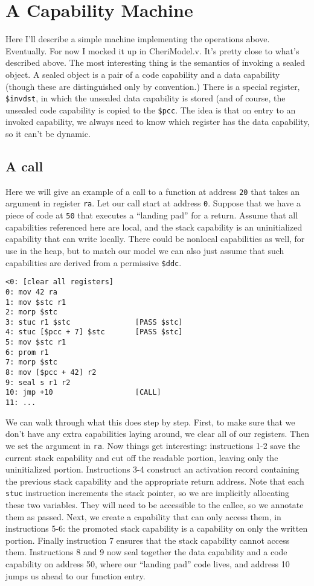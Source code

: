 \documentclass{article}
\begin{document}
\section{A Capability Machine}

Here I'll describe a simple machine implementing the operations above. Eventually. For now
I mocked it up in CheriModel.v. It's pretty close to what's described above. The most interesting
thing is the semantics of invoking a sealed object. A sealed object is a pair of a code capability
and a data capability (though these are distinguished only by convention.) There is a special register,
{\tt \$invdst}, in which the unsealed data capability is stored (and of course, the unsealed code capability
is copied to the {\tt \$pcc}. The idea is that on entry to an invoked capability, we always need to know
which register has the data capability, so it can't be dynamic.

\subsection{A call}

Here we will give an example of a call to a function at address {\tt 20} that takes an
argument in register {\tt ra}. Let our call start at address {\tt 0}. Suppose that we have a piece
of code at {\tt 50} that executes a ``landing pad'' for a return. Assume that all capabilities referenced
here are local, and the stack capability is an uninitialized capability that can write locally. There
could be nonlocal capabilities as well, for use in the heap, but to match our model we can also just assume
that such capabilities are derived from a permissive {\tt \$ddc}.

\begin{verbatim}
<0: [clear all registers]
0: mov 42 ra
1: mov $stc r1
2: morp $stc
3: stuc r1 $stc               [PASS $stc]
4: stuc [$pcc + 7] $stc       [PASS $stc]
5: mov $stc r1
6: prom r1
7: morp $stc
8: mov [$pcc + 42] r2
9: seal s r1 r2
10: jmp +10                   [CALL]
11: ...
\end{verbatim}

We can walk through what this does step by step. First, to make sure that we don't have any extra
capabilities laying around, we clear all of our registers. Then we set the argument in {\tt ra}.
Now things get interesting: instructions 1-2 save the current stack capability and cut off
the readable portion, leaving only the uninitialized portion. Instructions 3-4 construct an activation
record containing the previous stack capability and the appropriate return address. Note that each {\tt stuc}
instruction increments the stack pointer, so we are implicitly allocating these two variables.
They will need to be accessible to the callee, so we annotate them as passed. Next, we create a capability
that can only access them, in instructions 5-6: the promoted stack capability is a capability on
only the written portion. Finally instruction 7 ensures that the stack capability cannot access
them. Instructions 8 and 9 now seal together the data capability and a code capability on address
50, where our ``landing pad'' code lives, and address 10 jumps us ahead to our function entry.
\end{document}
